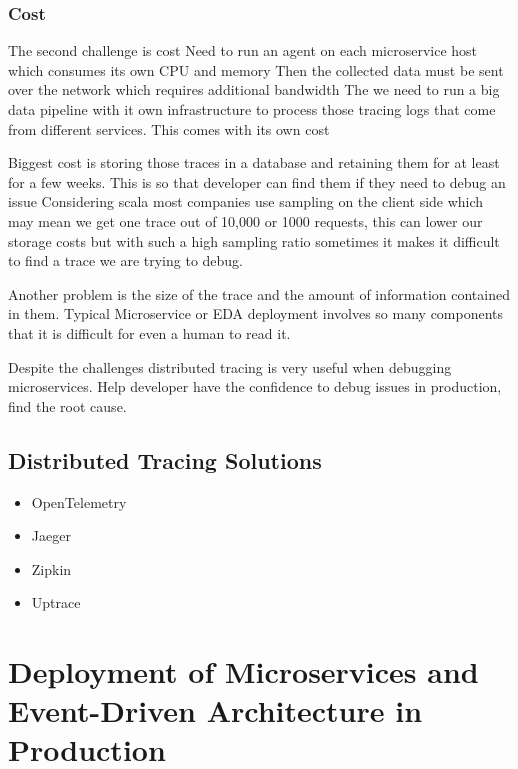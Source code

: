 \subsubsection{Cost}
The second challenge is cost
Need to run an agent on each microservice host which consumes its own CPU and memory
Then the collected data must be sent over the network which requires additional bandwidth
The we need to run a big data pipeline with it own infrastructure to process those tracing logs that come from different services.
This comes with its own cost

Biggest cost is storing those traces in a database and retaining them for at least for a few weeks.
This is so that developer can find them if they need to debug an issue
Considering scala most companies use sampling on the client side which may mean we get one trace out of 10,000 or 1000 requests,
this can lower our storage costs but with such a high sampling ratio sometimes it makes it difficult to find a trace we are trying to debug.

Another problem is the size of the trace and the amount of information contained in them.
Typical Microservice or EDA deployment involves so many components that it is difficult for even a human to read it.

Despite the challenges distributed tracing is very useful when debugging microservices.
Help developer have the confidence to debug issues in production, find the root cause.


\subsection{Distributed Tracing Solutions}
\begin{itemize}
    \item OpenTelemetry
    \item Jaeger
    \item Zipkin
    \item Uptrace
\end{itemize}


\section{Deployment of Microservices and Event-Driven Architecture in Production}

